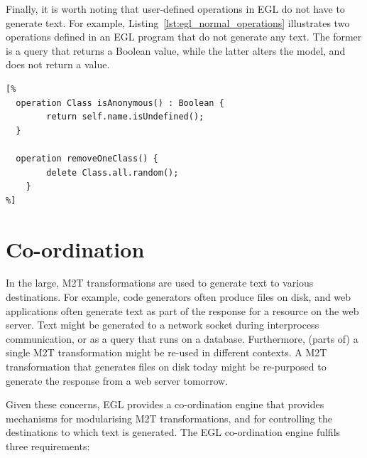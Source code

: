 Finally, it is worth noting that user-defined operations in EGL do not have to 
generate text. For example, Listing~\ref{lst:egl_normal_operations} 
illustrates two operations defined in an EGL program that do not generate any text.
The former is a query that returns a Boolean value, while the latter alters the model,
and does not return a value.

\begin{lstlisting}[float=tbp, basicstyle=\ttfamily\footnotesize, language=EGL, tabsize=2, flexiblecolumns=true, caption=Operations that do not generate any text., label=lst:egl_normal_operations]
[%
  operation Class isAnonymous() : Boolean {
		return self.name.isUndefined();
  }

  operation removeOneClass() {
		delete Class.all.random();
	}
%]
\end{lstlisting}


\section{Co-ordination}
\label{Co-ordination}
In the large, M2T transformations are used to generate text to various
destinations. For example, code generators often produce files on disk, 
and web applications often generate text as part of the response for a 
resource on the web server. Text might be generated to a network socket
during interprocess communication, or as a query that runs on a database.
Furthermore, (parts of) a single M2T transformation might be re-used in 
different contexts. A M2T transformation that generates files on disk today 
might be re-purposed to generate the response from a web server tomorrow.  

Given these concerns, EGL provides a co-ordination engine that provides
mechanisms for modularising M2T transformations, and for controlling the
destinations to which text is generated. The EGL co-ordination engine 
fulfils three requirements:

